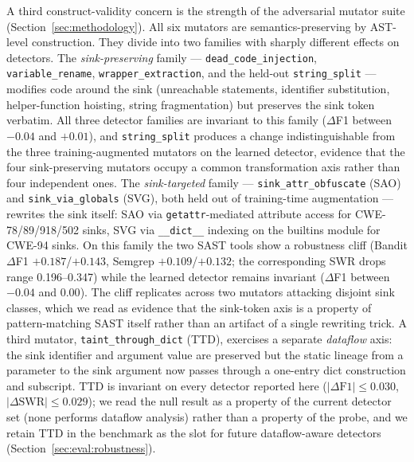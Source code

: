 A third construct-validity concern is the strength of the
adversarial mutator suite (Section~\ref{sec:methodology}). All six
mutators are semantics-preserving by AST-level construction. They
divide into two families with sharply different effects on
detectors. The \emph{sink-preserving} family —
\texttt{dead\_code\_injection}, \texttt{variable\_rename},
\texttt{wrapper\_extraction}, and the held-out \texttt{string\_split}
— modifies code around the sink (unreachable statements, identifier
substitution, helper-function hoisting, string fragmentation) but
preserves the sink token verbatim. All three detector families are
invariant to this family ($\Delta$F1 between $-0.04$ and $+0.01$),
and \texttt{string\_split} produces a change indistinguishable from
the three training-augmented mutators on the learned detector,
evidence that the four sink-preserving mutators occupy a common
transformation axis rather than four independent ones. The
\emph{sink-targeted} family — \texttt{sink\_attr\_obfuscate} (SAO)
and \texttt{sink\_via\_globals} (SVG), both held out of training-time
augmentation — rewrites the sink itself: SAO via
\texttt{getattr}-mediated attribute access for CWE-78/89/918/502
sinks, SVG via \texttt{\_\_dict\_\_} indexing on the builtins module
for CWE-94 sinks. On this family the two SAST tools show a
robustness cliff (Bandit $\Delta$F1 $+0.187$/$+0.143$, Semgrep
$+0.109$/$+0.132$; the corresponding SWR drops range 0.196--0.347)
while the learned detector remains invariant ($\Delta$F1 between
$-0.04$ and $0.00$). The cliff replicates across two mutators
attacking disjoint sink classes, which we read as evidence that the
sink-token axis is a property of pattern-matching SAST itself rather
than an artifact of a single rewriting trick. A third mutator,
\texttt{taint\_through\_dict} (TTD), exercises a separate
\emph{dataflow} axis: the sink identifier and argument value are
preserved but the static lineage from a parameter to the sink
argument now passes through a one-entry dict construction and
subscript. TTD is invariant on every detector reported here
($|\Delta\textrm{F1}| \le 0.030$, $|\Delta\textrm{SWR}| \le 0.029$);
we read the null result as a property of the current detector set
(none performs dataflow analysis) rather than a property of the
probe, and we retain TTD in the benchmark as the slot for future
dataflow-aware detectors (Section~\ref{sec:eval:robustness}).

